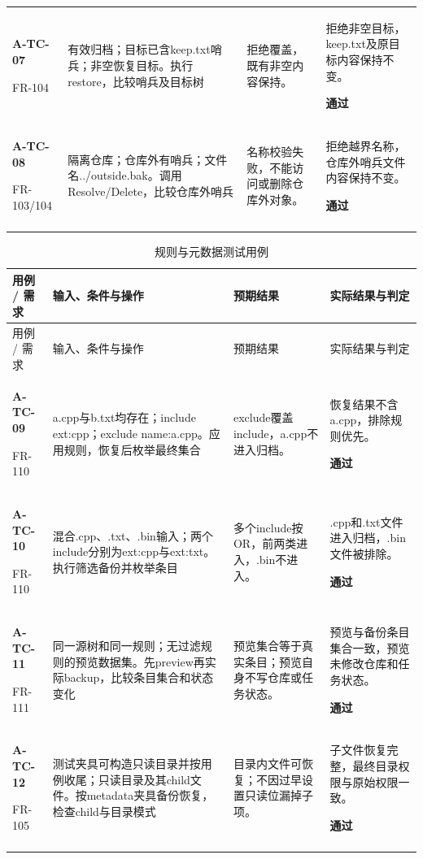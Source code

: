 \begin{longtable}{@{}L{.14\linewidth}L{.36\linewidth}L{.21\linewidth}L{.23\linewidth}@{}}
\textbf{A-TC-07}\par{\footnotesize FR-104} & 有效归档；目标已含keep.txt哨兵；非空恢复目标。执行restore，比较哨兵及目标树 & 拒绝覆盖，既有非空内容保持。 & 拒绝非空目标，keep.txt及原目标内容保持不变。\par\textbf{通过}\\\addlinespace[2pt]
\textbf{A-TC-08}\par{\footnotesize FR-103/104} & 隔离仓库；仓库外有哨兵；文件名../outside.bak。调用Resolve/Delete，比较仓库外哨兵 & 名称校验失败，不能访问或删除仓库外对象。 & 拒绝越界名称，仓库外哨兵文件内容保持不变。\par\textbf{通过}\\\addlinespace[2pt]
\end{longtable}

\begin{longtable}{@{}L{.14\linewidth}L{.36\linewidth}L{.21\linewidth}L{.23\linewidth}@{}}
\caption{规则与元数据测试用例}\label{tab:test-2}\\
\toprule 用例 / 需求 & 输入、条件与操作 & 预期结果 & 实际结果与判定\\\midrule\endfirsthead
\toprule 用例 / 需求 & 输入、条件与操作 & 预期结果 & 实际结果与判定\\\midrule\endhead
\bottomrule\endfoot
\textbf{A-TC-09}\par{\footnotesize FR-110} & a.cpp与b.txt均存在；include ext:cpp；exclude name:a.cpp。应用规则，恢复后枚举最终集合 & exclude覆盖include，a.cpp不进入归档。 & 恢复结果不含a.cpp，排除规则优先。\par\textbf{通过}\\\addlinespace[2pt]
\textbf{A-TC-10}\par{\footnotesize FR-110} & 混合.cpp、.txt、.bin输入；两个include分别为ext:cpp与ext:txt。执行筛选备份并枚举条目 & 多个include按OR，前两类进入，.bin不进入。 & .cpp和.txt文件进入归档，.bin文件被排除。\par\textbf{通过}\\\addlinespace[2pt]
\textbf{A-TC-11}\par{\footnotesize FR-111} & 同一源树和同一规则；无过滤规则的预览数据集。先preview再实际backup，比较条目集合和状态变化 & 预览集合等于真实条目；预览自身不写仓库或任务状态。 & 预览与备份条目集合一致，预览未修改仓库和任务状态。\par\textbf{通过}\\\addlinespace[2pt]
\textbf{A-TC-12}\par{\footnotesize FR-105} & 测试夹具可构造只读目录并按用例收尾；只读目录及其child文件。按metadata夹具备份恢复，检查child与目录模式 & 目录内文件可恢复；不因过早设置只读位漏掉子项。 & 子文件恢复完整，最终目录权限与原始权限一致。\par\textbf{通过}\\\addlinespace[2pt]

\end{longtable}
